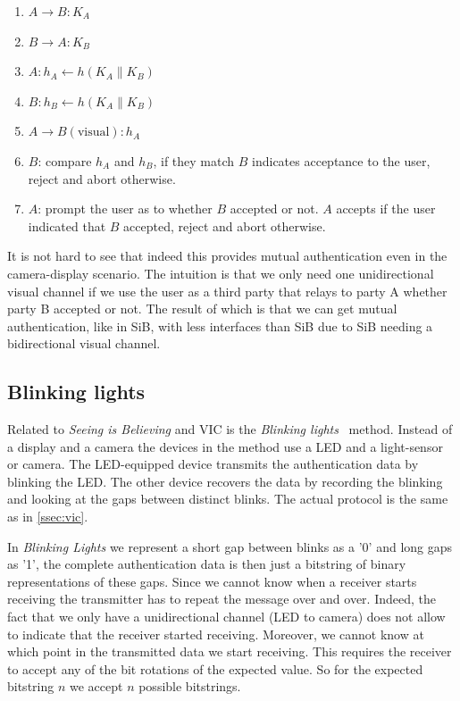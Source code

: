 \documentclass[conference, 11pt]{sty/IEEEtran}
\newlength{\arrow}
\begin{document}
\begin{enumerate}
    \item $A \rightarrow B: K_A$
    \item $B \rightarrow A: K_B$
    \item $A: h_A \gets h(K_A \| K_B)$
    \item $B: h_B \gets h(K_A \| K_B)$
    \item $A \rightarrow B(\text{visual}): h_A$
    \item $B$: compare $h_A$ and $h_B$, if they match $B$ indicates acceptance to the user, reject and abort otherwise.
    \item $A$: prompt the user as to whether $B$ accepted or not. $A$ accepts if the user indicated that $B$ accepted, reject and abort otherwise.
\end{enumerate}

It is not hard to see that indeed this provides mutual authentication even in the camera-display scenario.
The intuition is that we only need one unidirectional visual channel if we use the user as a third party that relays to party A whether party B accepted or not.
The result of which is that we can get mutual authentication, like in SiB, with less interfaces than SiB due to SiB needing a bidirectional visual channel.



\subsection{Blinking lights}
Related to \textit{Seeing is Believing} and VIC is the \textit{Blinking lights}~\cite{saxena2006secure} method.
Instead of a display and a camera the devices in the method use a LED and a light-sensor or camera.
The LED-equipped device transmits the authentication data by blinking the LED.
The other device recovers the data by recording the blinking and looking at the gaps between distinct blinks.
The actual protocol is the same as in \autoref{ssec:vic}.

In \emph{Blinking Lights} we represent a short gap between blinks as a '0' and long gaps as '1', the complete authentication data is then just a bitstring of binary representations of these gaps.
Since we cannot know when a receiver starts receiving the transmitter has to repeat the message over and over.
Indeed, the fact that we only have a unidirectional channel (LED to camera) does not allow to indicate that the receiver started receiving.
Moreover, we cannot know at which point in the transmitted data we start receiving.
This requires the receiver to accept any of the bit rotations of the expected value.
So for the expected bitstring $n$ we accept $n$ possible bitstrings.
\end{document}
